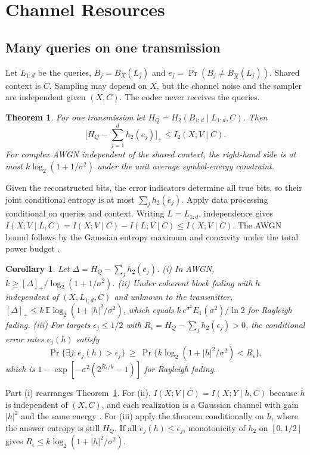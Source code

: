 \documentclass[10pt,conference]{IEEEtran}
\newtheorem{theorem}{Theorem}
\newtheorem{corollary}{Corollary}
\newcommand{\E}{\mathbb E}
\begin{document}
\section{Channel Resources}
\subsection{Many queries on one transmission}
Let $L_{1:d}$ be the queries, $B_j=B_X(L_j)$ and $e_j=\Pr(B_j\ne B_{\hat X}(L_j))$. Shared context is $C$. Sampling may depend on $X$, but the channel noise and the sampler are independent given $(X,C)$. The codec never receives the queries.
\begin{theorem}\label{thm:converse}
For one transmission let $H_Q=H_2(B_{1:d}\mid L_{1:d},C)$. Then
\begin{equation}
 \Big[H_Q-\sum_{j=1}^d h_2(e_j)\Big]_+
 \le I_2(X;V\mid C).
 \label{eq:converse}
\end{equation}
For complex AWGN independent of the shared context, the right-hand side is at most $k\log_2(1+1/\sigma^2)$ under the unit average symbol-energy constraint.
\end{theorem}
\begin{IEEEproof}
Given the reconstructed bits, the error indicators determine all true bits, so their joint conditional entropy is at most $\sum_jh_2(e_j)$. Apply data processing conditional on queries and context. Writing $L=L_{1:d}$, independence gives $I(X;V\mid L,C)=I(X;V\mid C)-I(L;V\mid C)\le I(X;V\mid C)$. The AWGN bound follows by the Gaussian entropy maximum and concavity under the total power budget \cite{cover2006elements}.
\end{IEEEproof}
\begin{corollary}\label{cor:channel}
Let $\Delta=H_Q-\sum_jh_2(e_j)$. (i) In AWGN, $k\ge[\Delta]_+/\log_2(1+1/\sigma^2)$. (ii) Under coherent block fading with $h$ independent of $(X,L_{1:d},C)$ and unknown to the transmitter, $[\Delta]_+\le k\,\E\log_2(1+|h|^2/\sigma^2)$, which equals $k\,e^{\sigma^2}E_1(\sigma^2)/\ln2$ for Rayleigh fading. (iii) For targets $\epsilon_j\le1/2$ with $R_\epsilon=H_Q-\sum_jh_2(\epsilon_j)>0$, the conditional error rates $e_j(h)$ satisfy
\begin{equation}
 \Pr\{\exists j:e_j(h)>\epsilon_j\}\ \ge\ \Pr\{k\log_2(1+|h|^2/\sigma^2)<R_\epsilon\},
\end{equation}
which is $1-\exp[-\sigma^2(2^{R_\epsilon/k}-1)]$ for Rayleigh fading.
\end{corollary}
\begin{IEEEproof}
Part (i) rearranges Theorem~\ref{thm:converse}. For (ii), $I(X;V\mid C)=I(X;Y\mid h,C)$ because $h$ is independent of $(X,C)$, and each realization is a Gaussian channel with gain $|h|^2$ and the same energy \cite{tse2005fundamentals}. For (iii) apply the theorem conditionally on $h$, where the answer entropy is still $H_Q$. If all $e_j(h)\le\epsilon_j$, monotonicity of $h_2$ on $[0,1/2]$ gives $R_\epsilon\le k\log_2(1+|h|^2/\sigma^2)$.
\end{IEEEproof}
\end{document}
